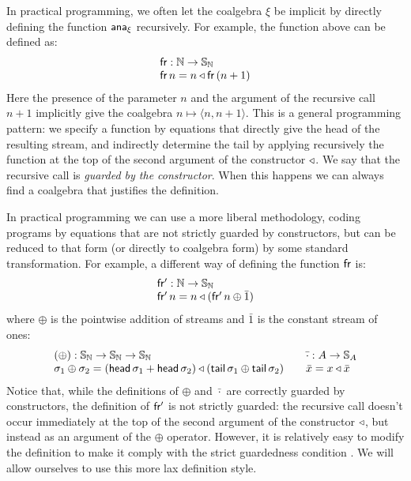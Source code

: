 In practical programming, we often let the coalgebra $\xi$ be implicit by directly defining the function $\mathsf{ana}_{\xi}$ recursively.
For example, the function above can be defined as:
$$
\begin{array}{l}
\mathsf{fr}: \mathbb{N} \rightarrow \mathbb{S}_{\mathbb{N}}\\
\mathsf{fr}\,n = n \triangleleft \mathsf{fr}\,(n+1)
\end{array}
$$
Here the presence of the parameter $n$ and the argument of the recursive call $n+1$ implicitly give the coalgebra $n \mapsto \langle n, n+1\rangle$.
This is a general programming pattern: we specify a function by equations that directly give the head of the resulting stream, and indirectly determine the tail
 by applying recursively the function at the top of the second argument of the constructor ${\triangleleft}$.
We say that the recursive call is {\em guarded by the constructor}.
When this happens we can always find a coalgebra that justifies the definition.

In practical programming we can use a more liberal methodology, coding programs by equations that are not strictly guarded by constructors, but can be reduced to that form (or directly to coalgebra form) by some standard transformation.
For example, a different way of defining the function $\mathsf{fr}$ is:
$$
\begin{array}{l}
\mathsf{fr'}: \mathbb{N} \rightarrow \mathbb{S}_{\mathbb{N}}\\
\mathsf{fr'}\,n = n \triangleleft (\mathsf{fr'}\,n \oplus \bar{1})
\end{array}
$$
where $\oplus$ is the pointwise addition of streams and $\bar{1}$ is the constant stream of ones:
$$
\begin{array}{l}
(\oplus): \mathbb{S}_{\mathbb{N}}\rightarrow \mathbb{S}_{\mathbb{N}}\rightarrow \mathbb{S}_{\mathbb{N}}\\
\sigma_1 \oplus \sigma_2 = (\mathsf{head}\,\sigma_1 + \mathsf{head}\,\sigma_2) \triangleleft (\mathsf{tail}\,\sigma_1 \oplus \mathsf{tail}\,\sigma_2)
\end{array}
\quad
\begin{array}{l}
\bar{\cdot}: A \rightarrow \mathbb{S}_{A}\\
\bar{x} = x \triangleleft \bar{x}
\end{array}
$$
Notice that, while the definitions of $\oplus$ and $\bar{\cdot}$ are correctly guarded by constructors, the definition of $\mathsf{fr'}$ is not strictly guarded: the recursive call doesn't occur immediately at the top of the second argument of the constructor $\triangleleft$, but instead as an argument of the $\oplus$ operator.
However, it is relatively easy to modify the definition to make it comply with the strict guardedness condition \cite{capretta:2011}.
We will allow ourselves to use this more lax definition style. \\

